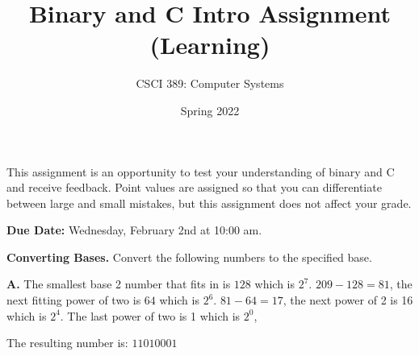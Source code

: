 \documentclass{exam}
\begin{document}
\title{Binary and C Intro Assignment (Learning)}
\author{CSCI 389: Computer Systems}
\date{Spring 2022}
\maketitle


This assignment is an opportunity to test your understanding of binary and C and receive feedback. 
Point values are assigned so that you can differentiate between large and small mistakes, but this assignment does not affect your grade. 

\textbf{Due Date:}
Wednesday, February 2nd at 10:00 am. 

\begin{questions}

\question[12]
\textbf{Converting Bases.}
Convert the following numbers to the specified base. 

\textbf{A.} The smallest base 2 number that fits in is $128$ which is $2^{7}$. $209-128=81$, the next fitting power of two is $64$ which is $2^6$. $81-64=17$, the next power of 2 is 16 which is $2^4$. The last power of two is 1 which is $2^0$,

The resulting number is: $1101 0001$


\end{questions}
\end{document}
